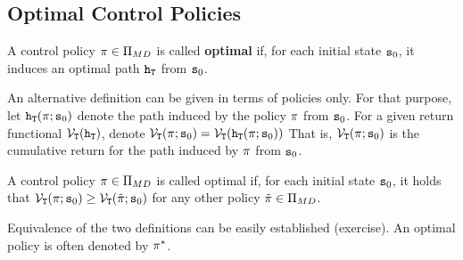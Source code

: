 \subsection{Optimal Control Policies}

\begin{definition}
A control policy $\pi\in\Pi_{MD} $ is called \textbf{optimal}
if, for each initial state ${{\tt s}_0}$, it induces an optimal path
${{\tt h}_{\tt T}}$ from ${{\tt s}_0}$.
\end{definition}

An alternative definition can be given in terms of policies only.
For that purpose, let ${{\tt h}_{\tt T}}(\pi ;{{\tt s}_0})$
denote the path induced by the policy $\pi $ from ${{\tt s}_0}$.
For a given return functional
${\mathcal{V}_{\tt T}}({{\tt h}_{\tt T}})$, denote
${\mathcal{V}_{\tt T}}(\pi ;{{\tt s}_0}) =
{\mathcal{V}_{\tt T}}({{\tt h}_{\tt T}}(\pi ;{{\tt s}_0}))$ That
is, ${\mathcal{V}_{\tt T}}(\pi ;{{\tt s}_0})$ is the cumulative
return for the path induced by $\pi $ from ${{\tt s}_0}$.

\begin{definition}
A control policy $\pi \in\Pi_{MD}$ is called optimal if, for
each initial state ${{\tt s}_0}$, it holds that
${\mathcal{V}_{\tt T}}(\pi ;{{\tt s}_0}) \ge
{\mathcal{V}_{\tt T}}(\tilde {\pi} ;{{\tt s}_0})$ for any other policy
$\tilde {\pi} \in\Pi_{MD}$.
\end{definition}

Equivalence of the two definitions can be easily established
(exercise). An optimal policy is often denoted by ${\pi ^*}$.

\vspace{10pt} 


\normalsize
